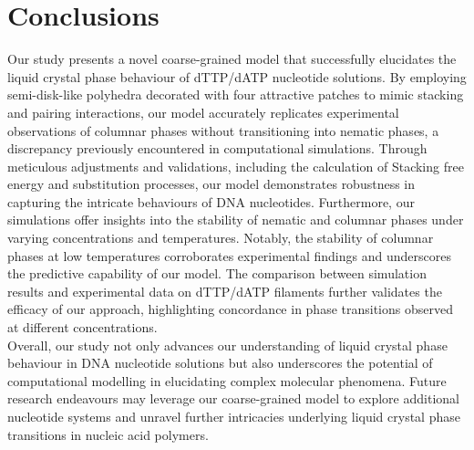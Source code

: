 \documentclass[aip,jcp, amsmath, amssymb, reprint]{revtex4-1}
\begin{document}
\section{\label{Dis}Conclusions}
Our study presents a novel coarse-grained model that successfully elucidates the liquid crystal phase behaviour of dTTP/dATP nucleotide solutions. By employing semi-disk-like polyhedra decorated with four attractive patches to mimic stacking and pairing interactions, our model accurately replicates experimental observations of columnar phases without transitioning into nematic phases, a discrepancy previously encountered in computational simulations. Through meticulous adjustments and validations, including the calculation of Stacking free energy and substitution processes, our model demonstrates robustness in capturing the intricate behaviours of DNA nucleotides. Furthermore, our simulations offer insights into the stability of nematic and columnar phases under varying concentrations and temperatures. Notably, the stability of columnar phases at low temperatures corroborates experimental findings and underscores the predictive capability of our model. The comparison between simulation results and experimental data on dTTP/dATP filaments further validates the efficacy of our approach, highlighting concordance in phase transitions observed at different concentrations. \\

Overall, our study not only advances our understanding of liquid crystal phase behaviour in DNA nucleotide solutions but also underscores the potential of computational modelling in elucidating complex molecular phenomena. Future research endeavours may leverage our coarse-grained model to explore additional nucleotide systems and unravel further intricacies underlying liquid crystal phase transitions in nucleic acid polymers.



\end{document}
